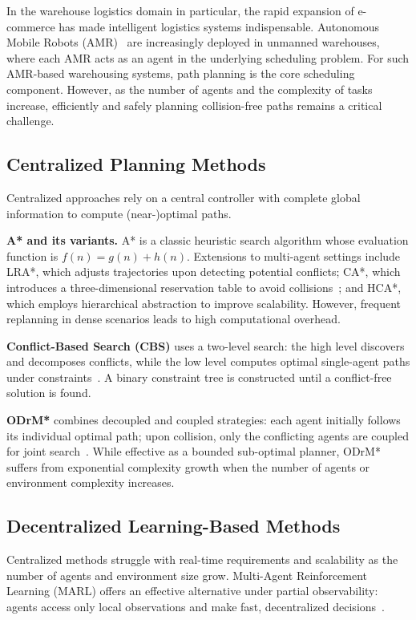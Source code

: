 \documentclass[sigconf]{acmart}
\begin{document}
In the warehouse logistics domain in particular, the rapid
expansion of e-commerce has made intelligent logistics systems
indispensable.
Autonomous Mobile Robots (AMR)~\cite{tamura2025human} are
increasingly deployed in unmanned warehouses, where each AMR
acts as an agent in the underlying scheduling problem.
For such AMR-based warehousing systems, path planning is the core
scheduling component.
However, as the number of agents and the complexity of tasks
increase, efficiently and safely planning collision-free paths
remains a critical challenge.

\subsection{Centralized Planning Methods}

Centralized approaches rely on a central controller with
complete global information to compute (near-)optimal paths.

\textbf{A* and its variants.}
A* is a classic heuristic search algorithm whose evaluation
function is $f(n)=g(n)+h(n)$.
Extensions to multi-agent settings include LRA*, which adjusts
trajectories upon detecting potential conflicts; CA*, which
introduces a three-dimensional reservation table to avoid
collisions~\cite{silver2005cooperative}; and HCA*, which
employs hierarchical abstraction to improve scalability.
However, frequent replanning in dense scenarios leads to
high computational overhead.

\textbf{Conflict-Based Search (CBS)} uses a two-level search:
the high level discovers and decomposes conflicts, while the low
level computes optimal single-agent paths under
constraints~\cite{sharon2015cbs}.
A binary constraint tree is constructed until a conflict-free
solution is found.

\textbf{ODrM*} combines decoupled and coupled strategies: each
agent initially follows its individual optimal path; upon
collision, only the conflicting agents are coupled for joint
search~\cite{ren2021subdimensional,ellis2021mapf}.
While effective as a bounded sub-optimal planner, ODrM* suffers
from exponential complexity growth when the number of agents or
environment complexity increases.

\subsection{Decentralized Learning-Based Methods}

Centralized methods struggle with real-time requirements and
scalability as the number of agents and environment size grow.
Multi-Agent Reinforcement Learning (MARL) offers an effective
alternative under partial observability: agents access only
local observations and make fast, decentralized
decisions~\cite{huang2021strategic}.
\end{document}
